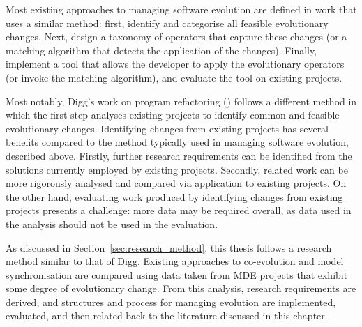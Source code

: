 Most existing approaches to managing software evolution are defined in work that uses a similar method: first, identify and categorise all feasible evolutionary changes. Next, design a taxonomy of operators that capture these changes (or a matching algorithm that detects the application of the changes). Finally, implement a tool that allows the developer to apply the evolutionary operators (or invoke the matching algorithm), and evaluate the tool on existing projects.

Most notably, Digg's work on program refactoring (\cite{dig06apis,dig06automatic,dig06detection,dig07cms}) follows a different method in which the first step analyses existing projects to identify common and feasible evolutionary changes. Identifying changes from existing projects has several benefits compared to the method typically used in managing software evolution, described above. Firstly, further research requirements can be identified from the solutions currently employed by existing projects. Secondly, related work can be more rigorously analysed and compared via application to existing projects. On the other hand, evaluating work produced by identifying changes from existing projects presents a challenge: more data may be required overall, as data used in the analysis should not be used in the evaluation.

As discussed in Section~\ref{sec:research_method}, this thesis follows a research method similar to that of Digg. Existing approaches to co-evolution and model synchronisation are compared using data taken from MDE projects that exhibit some degree of evolutionary change. From this analysis, research requirements are derived, and structures and process for managing evolution are implemented, evaluated, and then related back to the literature discussed in this chapter.
